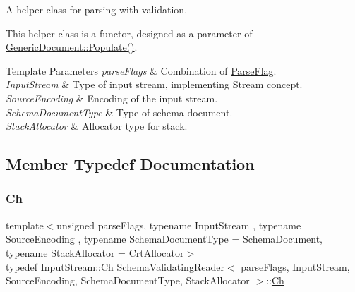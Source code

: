 A helper class for parsing with validation. 

This helper class is a functor, designed as a parameter of \hyperlink{classGenericDocument_a36fbc7d0a9595d26e0d2c8859d207d1f}{Generic\+Document\+::\+Populate()}.


\begin{DoxyTemplParams}{Template Parameters}
{\em parse\+Flags} & Combination of \hyperlink{reader_8h_ab7be7dabe6ffcba60fad441505583450}{Parse\+Flag}. \\
\hline
{\em Input\+Stream} & Type of input stream, implementing Stream concept. \\
\hline
{\em Source\+Encoding} & Encoding of the input stream. \\
\hline
{\em Schema\+Document\+Type} & Type of schema document. \\
\hline
{\em Stack\+Allocator} & Allocator type for stack. \\
\hline
\end{DoxyTemplParams}


\subsection{Member Typedef Documentation}
\mbox{\label{classSchemaValidatingReader_a6eb6f887a49dbb400800ab4fc01f02c7}} 
\subsubsection{\texorpdfstring{Ch}{Ch}}
{\footnotesize\ttfamily template$<$unsigned parse\+Flags, typename Input\+Stream , typename Source\+Encoding , typename Schema\+Document\+Type  = Schema\+Document, typename Stack\+Allocator  = Crt\+Allocator$>$ \\
typedef Input\+Stream\+::\+Ch \hyperlink{classSchemaValidatingReader}{Schema\+Validating\+Reader}$<$ parse\+Flags, Input\+Stream, Source\+Encoding, Schema\+Document\+Type, Stack\+Allocator $>$\+::\hyperlink{classSchemaValidatingReader_a6eb6f887a49dbb400800ab4fc01f02c7}{Ch}}

\mbox{\label{classSchemaValidatingReader_a30ecf1b20ca5a1b79e0d5f4ceb3bf198}} 
